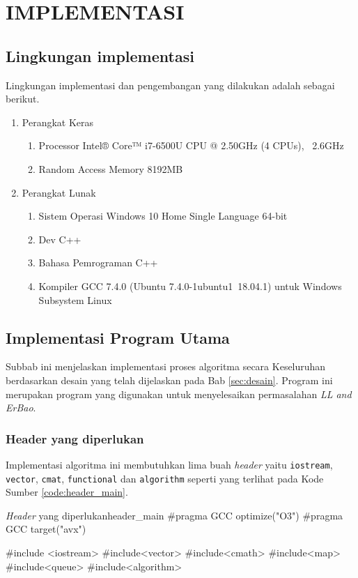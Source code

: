 \chapter {IMPLEMENTASI}

\section{Lingkungan implementasi}

Lingkungan implementasi dan pengembangan yang dilakukan adalah sebagai berikut.
\begin{enumerate}
	\item Perangkat Keras
	\begin{enumerate}
		\item Processor Intel® Core™ i7-6500U CPU @ 2.50GHz (4 CPUs), ~2.6GHz
		\item Random Access Memory 8192MB
	\end{enumerate}
	\item Perangkat Lunak
	\begin{enumerate}
		\item Sistem Operasi Windows 10 Home Single Language 64-bit
		\item Dev C++
		\item Bahasa Pemrograman C++
		\item Kompiler GCC 7.4.0 (Ubuntu 7.4.0-1ubuntu1~18.04.1) untuk Windows Subsystem Linux
	\end{enumerate}
\end{enumerate}

\section{Implementasi Program Utama}

Subbab ini menjelaskan implementasi proses algoritma secara Keseluruhan berdasarkan desain yang telah dijelaskan pada Bab \ref{sec:desain}. Program ini merupakan program yang digunakan untuk menyelesaikan permasalahan \textit{LL and ErBao}.

\subsection{Header yang diperlukan}
Implementasi algoritma ini membutuhkan lima buah \textit{header} yaitu \texttt{iostream}, \texttt{vector}, \texttt{cmat}, \texttt{functional} dan \texttt{algorithm} seperti yang terlihat pada Kode Sumber \ref{code:header_main}.

\begin{code}[firstnumber=1]{\textit{Header} yang diperlukan}{header_main}
#pragma GCC optimize("O3")
#pragma GCC target("avx")

#include <iostream>
#include<vector>
#include<cmath>
#include<map>
#include<queue>
#include<algorithm>
\end{code}

